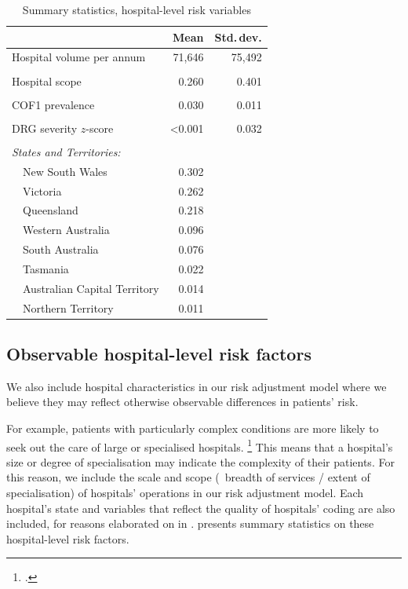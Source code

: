 \documentclass[submission]{grattan}
\begin{document}
\begin{table}
\caption{Summary statistics, hospital-level risk variables}\label{tbl:summary-statistics-hospital-level-risk-vars}
\begin{tabularx}{\linewidth}{cXrr}
\toprule
& & \textbf{Mean} & \textbf{Std.\,dev.}\tabularnewline
\midrule
\multicolumn{2}{l}{Hospital volume per annum}       &  71,646   &  75,492 \tabularnewline
\phantom{.} & & \\[-10pt]
\multicolumn{2}{l}{Hospital scope}                 & 0.260  & 0.401\tabularnewline
\phantom{.} & & \\[-10pt]
\multicolumn{2}{l}{COF1 prevalence}                & 0.030  & 0.011\tabularnewline
\phantom{.} & & \\[-10pt]
\multicolumn{2}{l}{DRG severity \(z\)-score}           & <0.001 & 0.032\tabularnewline
\phantom{.} & & \\[-10pt]
\multicolumn{2}{l}{\textit{States and Territories:}} &         & \tabularnewline
&New South Wales                & 0.302  & \tabularnewline
&Victoria                       & 0.262  & \tabularnewline
&Queensland                     & 0.218  & \tabularnewline
&Western Australia              & 0.096  & \tabularnewline
&South Australia                & 0.076  & \tabularnewline
&Tasmania                       & 0.022  & \tabularnewline
&Australian Capital Territory   & 0.014  & \tabularnewline
&Northern Territory             & 0.011  & \tabularnewline
\bottomrule
\end{tabularx}
\end{table}

\subsection{Observable hospital-level risk factors}\label{subsec:observable-hospital-level-risk-factors}

We also include hospital characteristics in our risk adjustment model where we believe they may reflect otherwise observable differences in patients' risk.

For example, patients with particularly complex conditions are more likely to seek out the care of large or specialised hospitals.%
	\footcite{Rajaram_2015}
This means that a hospital's size or degree of specialisation may indicate the complexity of their patients.
For this reason, we include the scale and scope (\ie~breadth of services / extent of specialisation) of hospitals' operations in our risk adjustment model.
Each hospital's state and variables that reflect the quality of hospitals' coding are also included, for reasons elaborated on in .
 presents summary statistics on these hospital-level risk factors.
\end{document}
